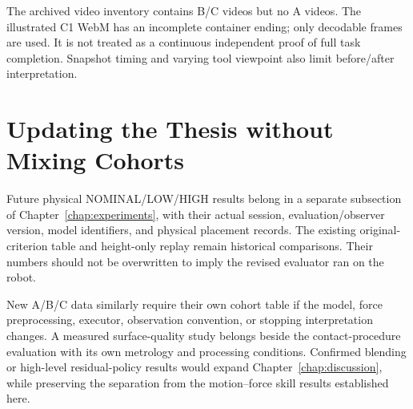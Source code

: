 The archived video inventory contains B/C videos but no A videos. The illustrated C1 WebM has an incomplete container ending; only decodable frames are used. It is not treated as a continuous independent proof of full task completion. Snapshot timing and varying tool viewpoint also limit before/after interpretation.

\section{Updating the Thesis without Mixing Cohorts}
Future physical NOMINAL/LOW/HIGH results belong in a separate subsection of Chapter~\ref{chap:experiments}, with their actual session, evaluation/observer version, model identifiers, and physical placement records. The existing original-criterion table and height-only replay remain historical comparisons. Their numbers should not be overwritten to imply the revised evaluator ran on the robot.

New A/B/C data similarly require their own cohort table if the model, force preprocessing, executor, observation convention, or stopping interpretation changes. A measured surface-quality study belongs beside the contact-procedure evaluation with its own metrology and processing conditions. Confirmed blending or high-level residual-policy results would expand Chapter~\ref{chap:discussion}, while preserving the separation from the motion--force skill results established here.
